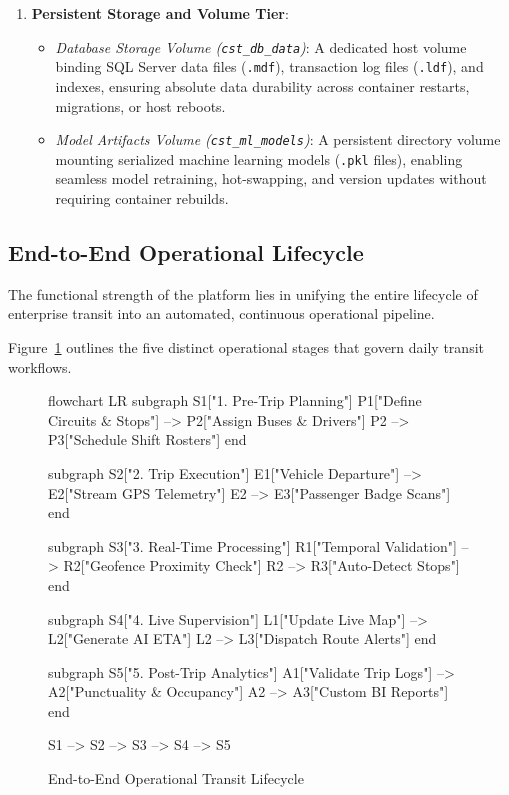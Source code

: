 \begin{enumerate}
  \item \textbf{Persistent Storage and Volume Tier}:
  \begin{itemize}
    \item \emph{Database Storage Volume (\texttt{cst\_db\_data})}: A dedicated host volume binding SQL Server data files (\texttt{.mdf}), transaction log files (\texttt{.ldf}), and indexes, ensuring absolute data durability across container restarts, migrations, or host reboots.
    \item \emph{Model Artifacts Volume (\texttt{cst\_ml\_models})}: A persistent directory volume mounting serialized machine learning models (\texttt{.pkl} files), enabling seamless model retraining, hot-swapping, and version updates without requiring container rebuilds.
  \end{itemize}
\end{enumerate}

\subsection{End-to-End Operational Lifecycle}
\label{subsec:operational_lifecycle}
The functional strength of the platform lies in unifying the entire lifecycle of enterprise transit into an automated, continuous operational pipeline. 

Figure~\ref{fig:operational_lifecycle} outlines the five distinct operational stages that govern daily transit workflows.

\begin{figure}[H]
  \centering
  \begin{mermaid}[width=0.98\textwidth]
flowchart LR
    subgraph S1["1. Pre-Trip Planning"]
        P1["Define Circuits & Stops"] --> P2["Assign Buses & Drivers"]
        P2 --> P3["Schedule Shift Rosters"]
    end

    subgraph S2["2. Trip Execution"]
        E1["Vehicle Departure"] --> E2["Stream GPS Telemetry"]
        E2 --> E3["Passenger Badge Scans"]
    end

    subgraph S3["3. Real-Time Processing"]
        R1["Temporal Validation"] --> R2["Geofence Proximity Check"]
        R2 --> R3["Auto-Detect Stops"]
    end

    subgraph S4["4. Live Supervision"]
        L1["Update Live Map"] --> L2["Generate AI ETA"]
        L2 --> L3["Dispatch Route Alerts"]
    end

    subgraph S5["5. Post-Trip Analytics"]
        A1["Validate Trip Logs"] --> A2["Punctuality & Occupancy"]
        A2 --> A3["Custom BI Reports"]
    end

    S1 --> S2 --> S3 --> S4 --> S5
  \end{mermaid}
  \caption{End-to-End Operational Transit Lifecycle}
  \label{fig:operational_lifecycle}
\end{figure}

